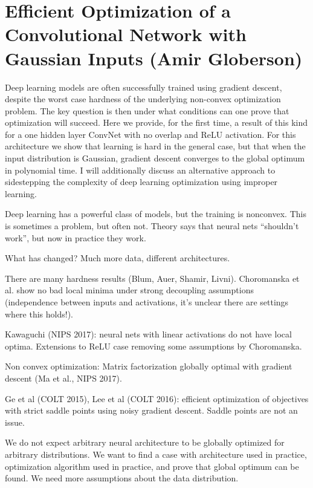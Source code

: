 \section{Efficient Optimization of a Convolutional Network with Gaussian Inputs (Amir Globerson)}

Deep learning models are often successfully trained using gradient descent, despite the worst case hardness of the underlying non-convex optimization problem. The key question is then under what conditions can one prove that optimization will succeed. Here we provide, for the first time, a result of this kind for a one hidden layer ConvNet with no overlap and ReLU activation. For this architecture we show that learning is hard in the general case, but that when the input distribution is Gaussian, gradient descent converges to the global optimum in polynomial time. I will additionally discuss an alternative approach to sidestepping the complexity of deep learning optimization using improper learning.

Deep learning has a powerful class of models, but the training is nonconvex. This is sometimes a problem, but often not. Theory says that neural nets ``shouldn't work'', but now in practice they work.

What has changed? Much more data, different architectures.

There are many hardness results (Blum, Auer, Shamir, Livni). Choromanska et al. show no bad local minima under strong decoupling assumptions (independence between inputs and activations, it's unclear there are settings where this holds!).

Kawaguchi (NIPS 2017): neural nets with linear activations do not have local optima. Extensions to ReLU case removing some assumptions by Choromanska.

Non convex optimization: Matrix factorization globally optimal with gradient descent (Ma et al., NIPS 2017).

Ge et al (COLT 2015), Lee et al (COLT 2016): efficient optimization of objectives with strict saddle points using noisy gradient descent. Saddle points are not an issue.


We do not expect arbitrary neural architecture to be globally optimized for arbitrary distributions. We want to find a case with architecture used in practice, optimization algorithm used in practice, and prove that global optimum can be found. We need more assumptions about the data distribution. 

